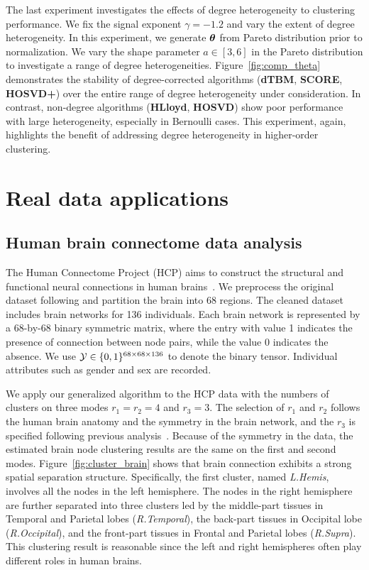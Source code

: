 \documentclass[lettersize,onecolumn,journal]{IEEEtran}
\theoremstyle{definition}
\theoremstyle{definition}
\begin{document}
The last experiment investigates the effects of degree heterogeneity to clustering performance. We fix the signal exponent $\gamma = -1.2$ and vary the extent of degree heterogeneity. In this experiment, we generate $\boldsymbol{\theta}$ from Pareto distribution prior to normalization. We vary the shape parameter $a \in [3,6]$ in the Pareto distribution to investigate a range of degree heterogeneities. Figure~\ref{fig:comp_theta} demonstrates the stability of degree-corrected algorithms (\textbf{\small dTBM}, \textbf{\small SCORE}, \textbf{\small HOSVD+}) over the entire range of degree heterogeneity under consideration. In contrast, non-degree algorithms (\textbf{\small HLloyd}, \textbf{\small HOSVD}) show poor performance with large heterogeneity, especially in Bernoulli cases. This experiment, again, highlights the benefit of addressing degree heterogeneity in higher-order clustering. 


\section{Real data applications}\label{sec:real}
\subsection{Human brain connectome data analysis}

The Human Connectome Project (HCP) aims to construct the structural and functional neural connections in human brains~\citep{van2013wu}. We preprocess the original dataset following \cite{desikan2006automated} and partition the brain into 68 regions. The cleaned dataset includes brain networks for 136 individuals. Each brain network is represented by a 68-by-68 binary symmetric matrix, where the entry with value 1 indicates the presence of connection between node pairs, while the value 0 indicates the absence. We use $\mathcal{Y} \in \{0,1\}^{68 \times 68 \times 136}$ to denote the binary tensor. Individual attributes such as gender and sex are recorded.

We apply our generalized algorithm to the HCP data with the numbers of clusters on three modes $r_1 = r_2 = 4$ and $r_3 = 3$. The selection of $r_1$ and $r_2$ follows the human brain anatomy and the symmetry in the brain network, and the $r_3$ is specified following previous analysis~\citep{hu2021generalized}. Because of the symmetry in the data, the estimated brain node clustering results are the same on the first and second modes. Figure~\ref{fig:cluster_brain} shows that brain connection exhibits a strong spatial separation structure. Specifically, the first cluster, named \emph{L.Hemis}, involves all the nodes in the left hemisphere. The nodes in the right hemisphere are further separated into three clusters led by the middle-part tissues in Temporal and Parietal lobes (\emph{R.Temporal}), the back-part tissues in Occipital lobe (\emph{R.Occipital}), and the front-part tissues in Frontal and Parietal lobes (\emph{R.Supra}). This clustering result is reasonable since the left and right hemispheres often play different roles in human brains. 
\end{document}
